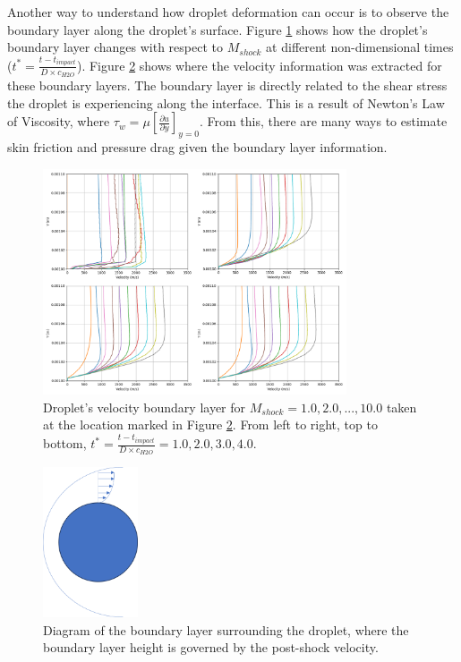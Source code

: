 \documentclass{UCF_ETD}
\begin{document}
Another way to understand how droplet deformation can occur is to observe the boundary layer along the droplet's surface.
Figure \ref{fig:boundary_layer_v_Mach} shows how the droplet's boundary layer changes with respect to $M_{shock}$ at different non-dimensional times ($t^{*} = \frac{t-t_{impact}}{D \times c_{H2O}}$). Figure \ref{fig:BL_diagram} shows where the velocity information was extracted for these boundary layers.
The boundary layer is directly related to the shear stress the droplet is experiencing along the interface. 
This is a result of Newton's Law of Viscosity, where $\tau_{w} = \mu \left[\frac{\partial u}{\partial y}\right]_{y=0}$. 
From this, there are many ways to estimate skin friction and pressure drag given the boundary layer information. 

\begin{figure}
    \centering
    \includegraphics[width=0.8\textwidth]{Figures/coplotted_BLs.png}
    \caption{Droplet's velocity boundary layer for $M_{shock} = 1.0, 2.0,...,10.0$ taken at the location marked in Figure \ref{fig:BL_diagram}. From left to right, top to bottom, $t^{*} = \frac{t-t_{impact}}{D \times c_{H2O}} = 1.0, 2.0, 3.0, 4.0$.}
    \label{fig:boundary_layer_v_Mach}
\end{figure}

\begin{figure}
    \centering
    \includegraphics[width=0.25\textwidth]{Figures/BL_diagram.png}
    \caption{Diagram of the boundary layer surrounding the droplet, where the boundary layer height is governed by the post-shock velocity.}
    \label{fig:BL_diagram}
\end{figure}
\end{document}
